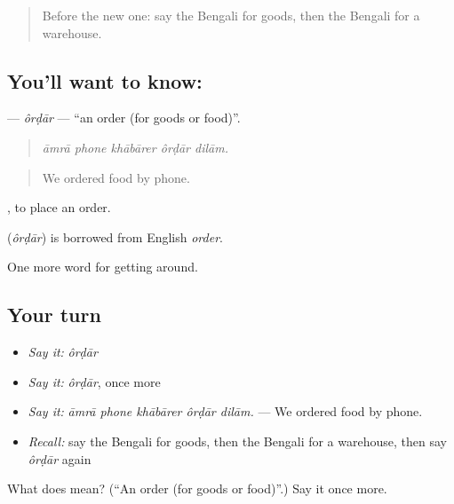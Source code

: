 \label{lesson:BN-C421-ordar}



\begin{quote}
Before the new one: say the Bengali for goods, then the Bengali for a warehouse.
\end{quote}

\subsection*{You'll want to know: }
\textbf{} — \emph{ôrḍār} — \textquotedblleft{}an order (for goods or food)\textquotedblright{}.

\begin{quote}
    
\end{quote}

\begin{quote}
\emph{āmrā phone khābārer ôrḍār dilām.}
\end{quote}

\begin{quote}
We ordered food by phone.
\end{quote}

 , to place an order.

\begin{cousinweb}
\textbf{} (\emph{ôrḍār}) is borrowed from English \emph{order}.
\end{cousinweb}

\begin{grammarlens}[title={What you've built}]
One more word for getting around.
\end{grammarlens}

\subsection*{Your turn}
\begin{itemize}
\raggedright
  \item \emph{Say it:} \emph{ôrḍār}
  \item \emph{Say it:} \emph{ôrḍār}, once more
  \item \emph{Say it:} \emph{āmrā phone khābārer ôrḍār dilām.} — We ordered food by phone.
  \item \emph{Recall:} say the Bengali for goods, then the Bengali for a warehouse, then say \emph{ôrḍār} again
\end{itemize}

\begin{tcolorbox}[breakable,colback=teal!4,colframe=teal!35!black,title={Before you move on}]
What does  mean? (\textquotedblleft{}An order (for goods or food)\textquotedblright{}.) Say it once more.
\end{tcolorbox}
